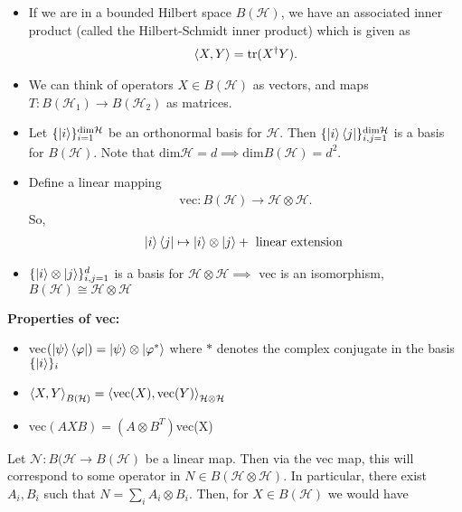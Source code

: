 \documentclass[10pt,oneside,longbibliography]{report}
\begin{document}
\begin{itemize}
    \item If we are in a bounded Hilbert space $B(\mathcal{H})$, we have an associated inner product (called the Hilbert-Schmidt inner product) which is given as
\begin{align}
    \braket{X,Y}=\text{tr}(X^{\dagger}Y). 
\end{align}
    \item We can think of operators $X\in B(\mathcal{H})$ as vectors, and maps $T:B(\mathcal{H}_1)\rightarrow B(\mathcal{H}_2)$ as matrices. 
    
    \item Let $\{\ket{i}\}_{i=1}^{\text{dim}\mathcal{H}}$ be an orthonormal basis for $\mathcal{H}$. Then $\{\ket{i}\bra{j}\}_{i,j=1}^{\text{dim}\mathcal{H}}$ is a basis for $B(\mathcal{H})$. Note that $\text{dim}\mathcal{H}=d \implies \text{dim}B(\mathcal{H})=d^2$. 
    
    \item Define a linear mapping 
    \begin{align}
        \text{vec}: B(\mathcal{H})\rightarrow \mathcal{H}\otimes \mathcal{H}.
    \end{align}
    So, 
    \begin{align}
        \ket{i}\bra{j} \mapsto \ket{i}\otimes \ket{j} + \text{ linear extension }
    \end{align}
    \item  $\{\ket{i}\otimes \ket{j}\}_{i,j=1}^d$ is a basis for $\mathcal{H} \otimes \mathcal{H} \implies$ vec is an isomorphism, $B(\mathcal{H}) \cong \mathcal{H} \otimes \mathcal{H}$
\end{itemize}
\textbf{Properties of vec:}
\begin{itemize}
    \item vec$(\ket{\psi}\bra{\varphi}) = \ket{\psi} \otimes \ket{{\varphi}^*}$ where $*$ denotes the complex conjugate in the basis $\{\ket{i}\}_i$
    \item $\braket{X,Y}_{B(\mathcal{H})}=\braket{\text{vec}(X),\text{vec}(Y)}_{\mathcal{H}\otimes \mathcal{H}}$
    \item vec$(A X B)=(A\otimes B^{T})$vec(X)
\end{itemize}
Let $\mathcal{N}: B(\mathcal{H}\rightarrow B(\mathcal{H}) $ be a linear map. Then via the vec map, this will correspond to some operator in $N \in B(\mathcal{H}\otimes \mathcal{H})$. In particular, there exist $A_i, B_i$ such that $N=\sum_i A_i \otimes B_i$. Then, for $X\in B(\mathcal{H})$ we would have 
\end{document}
